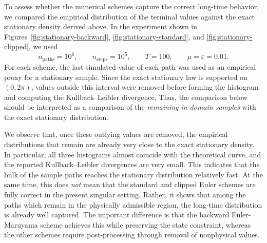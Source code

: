 \documentclass[11pt]{article}
\newcommand{\1}{\mathbbm{1}}
\theoremstyle{plain}
\theoremstyle{definition}
\theoremstyle{remark}
\begin{document}
To assess whether the numerical schemes capture the correct long-time behavior, we compared the empirical distribution of the terminal values against the exact stationary density derived above. In the experiment shown in Figures~\ref{fig:stationary-backward}, \ref{fig:stationary-standard}, and \ref{fig:stationary-clipped}, we used
\[
n_{\mathrm{paths}}=10^6,\qquad
n_{\mathrm{steps}}=10^5,\qquad
T=100,\qquad
\mu=\varepsilon=0.01.
\]
For each scheme, the last simulated value of each path was used as an empirical proxy for a stationary sample. Since the exact stationary law is supported on $(0,2\pi)$, values outside this interval were removed before forming the histogram and computing the Kullback--Leibler divergence. Thus, the comparison below should be interpreted as a comparison of the \emph{remaining in-domain samples} with the exact stationary distribution.

We observe that, once these outlying values are removed, the empirical distributions that remain are already very close to the exact stationary density. In particular, all three histograms almost coincide with the theoretical curve, and the reported Kullback--Leibler divergences are very small. This indicates that the bulk of the sample paths reaches the stationary distribution relatively fast. At the same time, this does \emph{not} mean that the standard and clipped Euler schemes are fully correct in the present singular setting. Rather, it shows that among the paths which remain in the physically admissible region, the long-time distribution is already well captured. The important difference is that the backward Euler-Maruyama scheme achieves this while preserving the state constraint, whereas the other schemes require post-processing through removal of nonphysical values.
\end{document}
